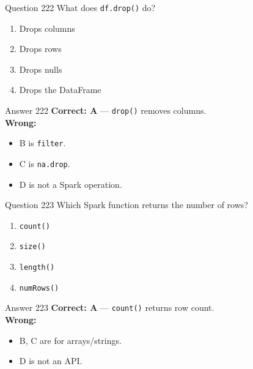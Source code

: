 \documentclass[aspectratio=169,11pt]{beamer}
\begin{document}
	\begin{frame}{Question 222}
		What does \texttt{df.drop()} do?
		\begin{enumerate}[label=\Alph*.]
			\item Drops columns
			\item Drops rows
			\item Drops nulls
			\item Drops the DataFrame
		\end{enumerate}
	\end{frame}
	\begin{frame}{Answer 222}
		\textbf{Correct: A} --- \texttt{drop()} removes columns.\\
		\vspace{0.5em}
		\textbf{Wrong:}
		\begin{itemize}
			\item B is \texttt{filter}.
			\item C is \texttt{na.drop}.
			\item D is not a Spark operation.
		\end{itemize}
	\end{frame}
	
	\begin{frame}{Question 223}
		Which Spark function returns the number of rows?
		\begin{enumerate}[label=\Alph*.]
			\item \texttt{count()}
			\item \texttt{size()}
			\item \texttt{length()}
			\item \texttt{numRows()}
		\end{enumerate}
	\end{frame}
	\begin{frame}{Answer 223}
		\textbf{Correct: A} --- \texttt{count()} returns row count.\\
		\vspace{0.5em}
		\textbf{Wrong:}
		\begin{itemize}
			\item B, C are for arrays/strings.
			\item D is not an API.
		\end{itemize}
	\end{frame}
	
\end{document}
